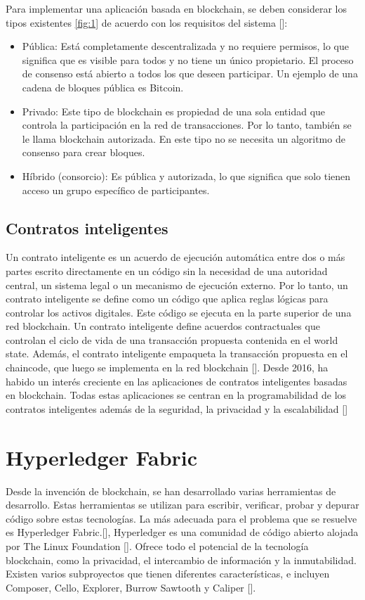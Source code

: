 Para implementar una aplicación basada en blockchain, se deben considerar los tipos existentes \ref{fig:1} de acuerdo con los requisitos del sistema [\cite{alhadhrami2017introducing}]:
\begin{itemize}
	\item Pública: Está completamente descentralizada y no requiere permisos, lo que significa que es visible para todos y no tiene un único propietario. El proceso de consenso está abierto a todos los que deseen participar. Un ejemplo de una cadena de bloques pública es Bitcoin.
	\item Privado: Este tipo de blockchain es propiedad de una sola entidad que controla la participación en la red de transacciones. Por lo tanto, también se le llama blockchain autorizada. En este tipo no se necesita un algoritmo de consenso para crear bloques.
	\item Híbrido (consorcio): Es pública y autorizada, lo que significa que solo tienen acceso un grupo específico de participantes.
\end{itemize}

\subsection{Contratos inteligentes}

Un contrato inteligente es un acuerdo de ejecución automática entre dos o más partes escrito directamente en un código sin la necesidad de una autoridad central, un sistema legal o un mecanismo de ejecución externo. Por lo tanto, un contrato inteligente se define como un código que aplica reglas lógicas para controlar los activos digitales. Este código se ejecuta en la parte superior de una red blockchain. Un contrato inteligente define acuerdos contractuales que controlan el ciclo de vida de una transacción propuesta contenida en el world state. Además, el contrato inteligente empaqueta la transacción  propuesta en el chaincode, que luego se implementa en la red blockchain [\cite{zhao2021security}]. Desde 2016, ha habido un interés creciente en las aplicaciones de contratos inteligentes basadas en blockchain. Todas estas aplicaciones se centran en la programabilidad de los contratos inteligentes además de la seguridad, la privacidad y la escalabilidad [\cite{macrinici2018smart}]

\section{Hyperledger Fabric}
Desde la invención de blockchain, se han desarrollado varias herramientas de desarrollo. Estas herramientas se utilizan para escribir, verificar, probar y depurar código sobre estas tecnologías. 
La más adecuada para el problema que se resuelve es Hyperledger Fabric.[\cite{kumutha2021impact}], Hyperledger es una comunidad de código abierto alojada por The Linux Foundation [\cite{nakamoto2008bitcoin}]. Ofrece todo el potencial de la tecnología blockchain, como la privacidad, el intercambio de información y la inmutabilidad. Existen varios subproyectos que tienen diferentes características, e incluyen Composer, Cello, Explorer, Burrow Sawtooth y Caliper [\cite{ullah2021blockchain}].

